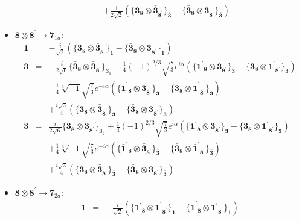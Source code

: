 \documentclass[english]{article}
\newcommand{\subcg}[3]{\big\{ {#1}\otimes{#2}\big\}^{}_{#3}}
\newcommand{\rep}[1]{\mathbf{#1}}
\begin{document}
\begin{itemize}
\begin{eqnarray*}
 & & +\frac{1}{2 \sqrt{2}}\left(\subcg{\rep{3}_{\rep{8}}}{\rep{\bar{3}}_{\rep{8^{\prime}}}}{\rep{\bar{3}}}-\subcg{\rep{\bar{3}}_{\rep{8}}}{\rep{3}_{\rep{8^{\prime}}}}{\rep{\bar{3}}}\right)
\end{eqnarray*}
\item $\rep{8}\otimes\rep{8^{\prime}}\to\rep{7}_{1a}$:
\begin{eqnarray*}
\rep{1} &=& -\frac{i}{\sqrt{2}}\left(\subcg{\rep{3}_{\rep{8}}}{\rep{\bar{3}}_{\rep{8^{\prime}}}}{\rep{1}}-\subcg{\rep{\bar{3}}_{\rep{8}}}{\rep{3}_{\rep{8^{\prime}}}}{\rep{1}}\right)
\\
\rep{3} &=& -\frac{i}{2 \sqrt{6}}\subcg{\rep{\bar{3}}_{\rep{8}}}{\rep{\bar{3}}_{\rep{8^{\prime}}}}{\rep{3}_{a}}-\frac{1}{4} (-1)^{2/3} \sqrt{\frac{7}{3}} e^{i \alpha }\left(\subcg{\rep{1^{\prime}}_{\rep{8}}}{\rep{3}_{\rep{8^{\prime}}}}{\rep{3}}-\subcg{\rep{3}_{\rep{8}}}{\rep{1^{\prime}}_{\rep{8^{\prime}}}}{\rep{3}}\right) \\ 
 & & -\frac{1}{4} \sqrt[3]{-1} \sqrt{\frac{7}{3}} e^{-i \alpha }\left(\subcg{\rep{\bar{1}^{\prime}}_{\rep{8}}}{\rep{3}_{\rep{8^{\prime}}}}{\rep{3}}-\subcg{\rep{3}_{\rep{8}}}{\rep{\bar{1}^{\prime}}_{\rep{8^{\prime}}}}{\rep{3}}\right) \\ 
 & & +\frac{i \sqrt{3}}{4}\left(\subcg{\rep{3}_{\rep{8}}}{\rep{\bar{3}}_{\rep{8^{\prime}}}}{\rep{3}}-\subcg{\rep{\bar{3}}_{\rep{8}}}{\rep{3}_{\rep{8^{\prime}}}}{\rep{3}}\right)
\\
\rep{\bar{3}} &=& \frac{i}{2 \sqrt{6}}\subcg{\rep{3}_{\rep{8}}}{\rep{3}_{\rep{8^{\prime}}}}{\rep{\bar{3}}_{a}}+\frac{1}{4} (-1)^{2/3} \sqrt{\frac{7}{3}} e^{i \alpha }\left(\subcg{\rep{1^{\prime}}_{\rep{8}}}{\rep{\bar{3}}_{\rep{8^{\prime}}}}{\rep{\bar{3}}}-\subcg{\rep{\bar{3}}_{\rep{8}}}{\rep{1^{\prime}}_{\rep{8^{\prime}}}}{\rep{\bar{3}}}\right) \\ 
 & & +\frac{1}{4} \sqrt[3]{-1} \sqrt{\frac{7}{3}} e^{-i \alpha }\left(\subcg{\rep{\bar{1}^{\prime}}_{\rep{8}}}{\rep{\bar{3}}_{\rep{8^{\prime}}}}{\rep{\bar{3}}}-\subcg{\rep{\bar{3}}_{\rep{8}}}{\rep{\bar{1}^{\prime}}_{\rep{8^{\prime}}}}{\rep{\bar{3}}}\right) \\ 
 & & +\frac{i \sqrt{3}}{4}\left(\subcg{\rep{3}_{\rep{8}}}{\rep{\bar{3}}_{\rep{8^{\prime}}}}{\rep{\bar{3}}}-\subcg{\rep{\bar{3}}_{\rep{8}}}{\rep{3}_{\rep{8^{\prime}}}}{\rep{\bar{3}}}\right)
\end{eqnarray*}
\item $\rep{8}\otimes\rep{8^{\prime}}\to\rep{7}_{2a}$:
\begin{eqnarray*}
\rep{1} &=& -\frac{i}{\sqrt{2}}\left(\subcg{\rep{1^{\prime}}_{\rep{8}}}{\rep{\bar{1}^{\prime}}_{\rep{8^{\prime}}}}{\rep{1}}-\subcg{\rep{\bar{1}^{\prime}}_{\rep{8}}}{\rep{1^{\prime}}_{\rep{8^{\prime}}}}{\rep{1}}\right)

\end{eqnarray*}
\end{itemize}
\end{document}
